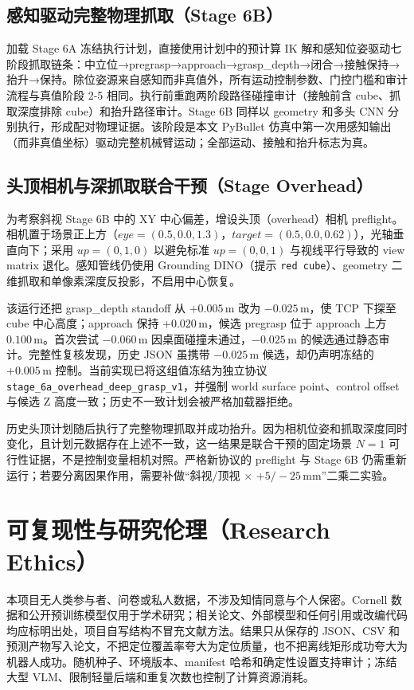 \documentclass{l4proj}
\begin{document}
\subsection{感知驱动完整物理抓取（Stage 6B）}
加载 Stage 6A 冻结执行计划，直接使用计划中的预计算 IK 解和感知位姿驱动七阶段抓取链条：中立位→pregrasp→approach→grasp\_depth→闭合→接触保持→抬升→保持。除位姿源来自感知而非真值外，所有运动控制参数、门控门槛和审计流程与真值阶段 2-5 相同。执行前重跑两阶段路径碰撞审计（接触前含 cube、抓取深度排除 cube）和抬升路径审计。Stage 6B 同样以 geometry 和多头 CNN 分别执行，形成配对物理证据。该阶段是本文 PyBullet 仿真中第一次用感知输出（而非真值坐标）驱动完整机械臂运动；全部运动、接触和抬升标志为真。

\subsection{头顶相机与深抓取联合干预（Stage Overhead）}
为考察斜视 Stage 6B 中的 XY 中心偏差，增设头顶（overhead）相机 preflight。相机置于场景正上方（$\textit{eye}=(0.5,0.0,1.3)$，$\textit{target}=(0.5,0.0,0.62)$），光轴垂直向下；采用 $\textit{up}=(0,1,0)$ 以避免标准 $\textit{up}=(0,0,1)$ 与视线平行导致的 view matrix 退化。感知管线仍使用 Grounding DINO（提示 \texttt{red cube}）、geometry 二维抓取和单像素深度反投影，不启用中心恢复。

该运行还把 grasp\_depth standoff 从 $+0.005$\,m 改为 $-0.025$\,m，使 TCP 下探至 cube 中心高度；approach 保持 $+0.020$\,m，候选 pregrasp 位于 approach 上方 $0.100$\,m。首次尝试 $-0.060$\,m 因桌面碰撞未通过，$-0.025$\,m 的候选通过静态审计。完整性复核发现，历史 JSON 虽携带 $-0.025$\,m 候选，却仍声明冻结的 $+0.005$\,m 控制。当前实现已将这组值冻结为独立协议 \texttt{stage\_6a\_overhead\_deep\_grasp\_v1}，并强制 world surface point、control offset 与候选 Z 高度一致；历史不一致计划会被严格加载器拒绝。

历史头顶计划随后执行了完整物理抓取并成功抬升。因为相机位姿和抓取深度同时变化，且计划元数据存在上述不一致，这一结果是联合干预的固定场景 $N=1$ 可行性证据，不是控制变量相机对照。严格新协议的 preflight 与 Stage 6B 仍需重新运行；若要分离因果作用，需要补做“斜视/顶视 $\times$ $+5/-25$\,mm”二乘二实验。

\section{可复现性与研究伦理（Research Ethics）}
本项目无人类参与者、问卷或私人数据，不涉及知情同意与个人保密。Cornell 数据和公开预训练模型仅用于学术研究；相关论文、外部模型和任何引用或改编代码均应标明出处，项目自写结构不冒充文献方法。结果只从保存的 JSON、CSV 和预测产物写入论文，不把定位覆盖率夸大为定位质量，也不把离线矩形成功夸大为机器人成功。随机种子、环境版本、manifest 哈希和确定性设置支持审计；冻结大型 VLM、限制轻量后端和重复次数也控制了计算资源消耗。
\end{document}
